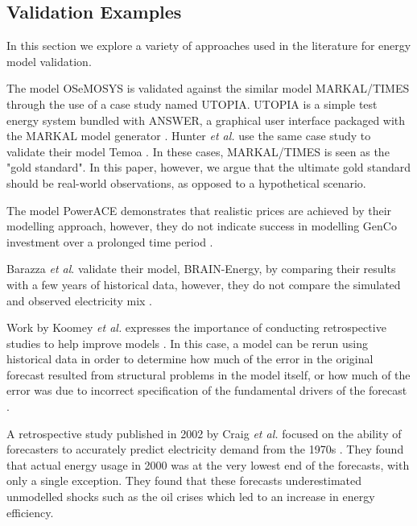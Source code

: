 \subsection{Validation Examples}

In this section we explore a variety of approaches used in the literature for energy model validation.

The model OSeMOSYS \cite{Howells2011} is validated against the similar model MARKAL\slash TIMES through the use of a case study named UTOPIA. UTOPIA is a simple test energy system bundled with ANSWER, a graphical user interface packaged with the MARKAL model generator \cite{Hunter2013, Noble2004}. Hunter \textit{et al.} use the same case study to validate their model Temoa \cite{Hunter2013}. In these cases, MARKAL\slash TIMES is seen as the "gold standard". In this paper, however, we argue that the ultimate gold standard should be real-world observations, as opposed to a hypothetical scenario.

The model PowerACE demonstrates that realistic prices are achieved by their modelling approach, however, they do not indicate success in modelling GenCo investment over a prolonged time period \cite{Ringler2012}.

Barazza \textit{et al}. validate their model, BRAIN-Energy, by comparing their results with a few years of historical data, however, they do not compare the simulated and observed electricity mix \cite{Barazza2020}.

Work by Koomey \textit{et al.} expresses the importance of conducting retrospective studies to help improve models \cite{Koomey2003}. In this case, a model can be rerun using historical data in order to determine how much of the error in the original forecast resulted from structural problems in the model itself, or how much of the error was due to incorrect specification of the fundamental drivers of the forecast \cite{Koomey2003}.

A retrospective study published in 2002 by Craig \textit{et al.} focused on the ability of forecasters to accurately predict electricity demand from the 1970s \cite{Craig2002}. They found that actual energy usage in 2000 was at the very lowest end of the forecasts, with only a single exception. They found that these forecasts underestimated unmodelled shocks such as the oil crises which led to an increase in energy efficiency.

